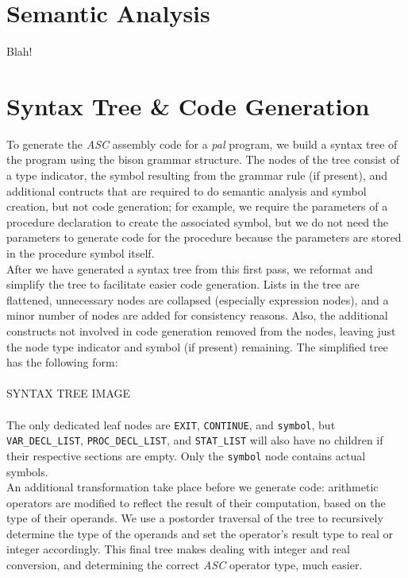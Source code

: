 \documentclass{report}
\begin{document}
\section*{Semantic Analysis}
Blah!


\section*{Syntax Tree \& Code Generation}
To generate the \emph{ASC} assembly code for a \emph{pal} program, we build a syntax tree of the program using the bison grammar structure. The nodes of the tree consist of a type indicator, the symbol resulting from the grammar rule (if present), and additional contructs that are required to do semantic analysis and symbol creation, but not code generation; for example, we require the parameters of a procedure declaration to create the associated symbol, but we do not need the parameters to generate code for the procedure because the parameters are stored in the procedure symbol itself.\\

After we have generated a syntax tree from this first pass, we reformat and simplify the tree to facilitate easier code generation. Lists in the tree are flattened, unnecessary nodes are collapsed (especially expression nodes), and a minor number of nodes are added for consistency reasons. Also, the additional constructs not involved in code generation removed from the nodes, leaving just the node type indicator and symbol (if present) remaining. The simplified tree has the following form: \\

\\
SYNTAX TREE IMAGE\\
\\

The only dedicated leaf nodes are \texttt{EXIT}, \texttt{CONTINUE}, and \texttt{symbol}, but \texttt{VAR_DECL_LIST}, \texttt{PROC_DECL_LIST},  and \texttt{STAT_LIST} will also have no children if their respective sections are empty. Only the \texttt{symbol} node contains actual symbols.\\

An additional transformation take place before we generate code: arithmetic operators are modified to reflect the result of their computation, based on the type of their operands. We use a postorder traversal of the tree to recursively determine the type of the operands and set the operator's result type to real or integer accordingly. This final tree makes dealing with integer and real conversion, and determining the correct \emph{ASC} operator type, much easier.
\end{document}
